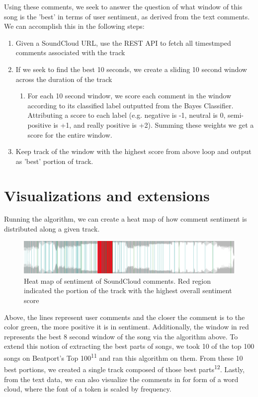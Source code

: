 \documentclass[12pt]{dalcsthesis}
\begin{document}
Using these comments, we seek to answer the question of what window of this song is the 'best' in terms of user sentiment, as derived from the text comments. We can accomplish this in the following steps:

\begin{enumerate}
  \item Given a SoundCloud URL, use the REST API to fetch all timestmped comments associated with the track
  \item If we seek to find the best 10 seconds, we create a sliding 10 second window across the duration of the track
	\begin{enumerate}
		\item For each 10 second window, we score each comment in the window according to its classified label outputted from the Bayes Classifier. Attributing a score to each label (e.g. negative is -1, neutral is 0, semi-positive is +1, and really positive is +2). Summing these weights we get a score for the entire window.  
	\end{enumerate}
  \item Keep track of the window with the highest score from above loop and output as 'best' portion of track.
\end{enumerate}

\section{Visualizations and extensions}

Running the algorithm, we can create a heat map of how comment sentiment is distributed along a given track. 

\begin{figure}[h]
\includegraphics[scale=.45]{best_window}
\centering
\caption{Heat map of sentiment of SoundCloud comments. Red region indicated the portion of the track with the highest overall sentiment score}
\end{figure}

Above, the lines represent user comments and the closer the comment is to the color green, the more positive it is in sentiment. Additionally, the window in red represents the best 8 second window of the song via the algorithm above. To extend this notion of extracting the best parts of songs, we took 10 of the top 100 songs on Beatport's Top 100\textsuperscript{11} and ran this algorithm on them. From these 10 best portions, we created a single track composed of those best parts\textsuperscript{12}. Lastly, from the text data, we can also visualize the comments in for form of a word cloud, where the font of a token is scaled by frequency.
\end{document}
